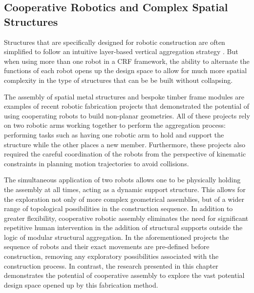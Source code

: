     \subsection{Cooperative Robotics and Complex Spatial Structures}\label{sec:robo1}
        Structures that are specifically designed for robotic construction are often simplified to follow an intuitive layer-based vertical aggregation strategy \citep{bonwetsch_informed_2006,bonwetsch_digitally_2007}. But when using more than one robot in a CRF framework, the ability to alternate the functions of each robot opens up the design space to allow for much more spatial complexity in the type of structures that can be be built without collapsing.
        
        The assembly of spatial metal structures \citep{parascho_cooperative_2017,parascho_computational_2018, parascho_cooperative_2019} and bespoke timber frame modules \citep{thoma_robotic_2018} are examples of recent robotic fabrication projects that demonstrated the potential of using cooperating robots to build non-planar geometries. All of these projects rely on two robotic arms working together to perform the aggregation process: performing tasks such as having one robotic arm to hold and support the structure while the other places a new member. Furthermore, these projects also required the careful coordination of the robots from the perspective of kinematic constraints in planning motion trajectories \citep{gandia_towards_2018} to avoid collisions. 
         
        The simultaneous application of two robots allows one to be physically holding the assembly at all times, acting as a dynamic support structure. This allows for the exploration not only of more complex geometrical assemblies, but of a wider range of topological possibilities in the construction sequence. In addition to greater flexibility, cooperative robotic assembly eliminates the need for significant repetitive human intervention in the addition of structural supports outside the logic of modular structural aggregation. In the aforementioned projects the sequence of robots and their exact movements are pre-defined before construction, removing any exploratory possibilities associated with the construction process. In contrast, the research presented in this chapter demonstrates the potential of cooperative assembly to explore the vast potential design space opened up by this fabrication method.
        
